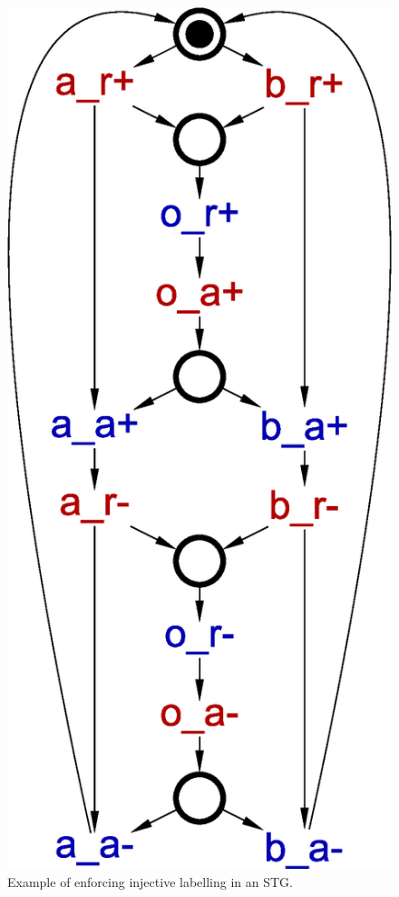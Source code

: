 \begin{figure}[!tb]
    \hfill%
    \includegraphics[scale=0.3]{EXPERIMENTS/stg/mix_full_inj}%
    \hfill%
    {}
    \caption{\label{fi-enforce-inj}
        Example of enforcing injective labelling in an STG.
    }
\end{figure}

